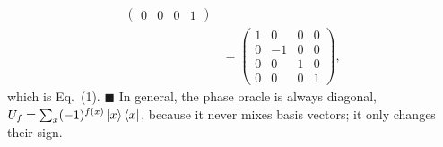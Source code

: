 \documentclass[a4paper, 10pt]{article}
\begin{document}
\begin{solution}
\begin{align*}
\begin{pmatrix}
			  0 & 0 & 0 & 1
		  \end{pmatrix}                                                            \\
		    & = \begin{pmatrix}
			        1 & 0  & 0 & 0 \\
			        0 & -1 & 0 & 0 \\
			        0 & 0  & 1 & 0 \\
			        0 & 0  & 0 & 1
		        \end{pmatrix},
	\end{align*}
	which is Eq.~(1). \( \blacksquare \) In general, the phase oracle is always diagonal, \( U_f = \sum_x (-1)^{f(x)}\ket{x}\bra{x} \), because it never mixes basis vectors; it only changes their sign.
\end{solution}
\end{document}
